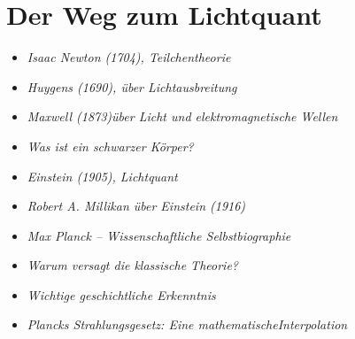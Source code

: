 \section{Der Weg zum Lichtquant}
\vspace{1em}
\begin{tcolorbox}[title=physikalische Boxen,physikbox]
\begin{itemize}
	\item \emph{Isaac Newton (1704), Teilchentheorie} \dotfill\pageref{box:newton}
	\item \emph{Huygens (1690), über Lichtausbreitung}\dotfill\pageref{box:huygens}
	\item \emph{Maxwell (1873)über Licht und \newline elektromagnetische Wellen} \dotfill\pageref{box:maxwell}
	\item \emph{Was ist ein schwarzer Körper?} \dotfill\pageref{box:schwarzerkoerper}
	\item \emph{Einstein (1905), Lichtquant}\dotfill\pageref{box:einstein-lichtquant}
	\item \emph{Robert A. Millikan über Einstein (1916)} \dotfill\pageref{box:millikan-einstein}
	\item \emph{Max Planck – Wissenschaftliche Selbstbiographie}\dotfill\pageref{box:planck-zitat}
\end{itemize}
\end{tcolorbox}

\vspace{1em}
\begin{tcolorbox}[title=didaktische Boxen,didaktikbox]
\begin{itemize}
	\item \emph{Warum versagt die klassische Theorie?} \dotfill\pageref{box:klassik-versagt}
	\item \emph{Wichtige geschichtliche Erkenntnis} \dotfill\pageref{box:geschichte-planck}
\end{itemize}
\end{tcolorbox}

\vspace{1em}
\begin{tcolorbox}[title=mathematische Boxen,mathebox]
\begin{itemize}
	\item \emph{Plancks Strahlungsgesetz: Eine mathematische\newline Interpolation}\dotfill\pageref{box:planck-interpolation}
\end{itemize}
\end{tcolorbox}


